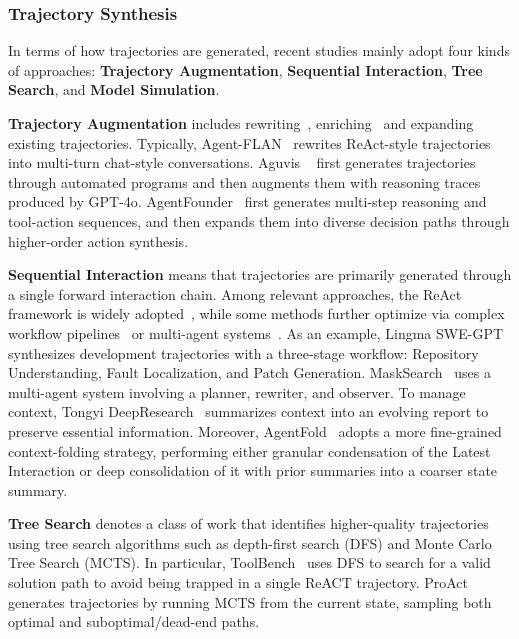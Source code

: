 \documentclass{llmxive}
\begin{document}
\subsubsection{Trajectory Synthesis}
\label{sec:Trajectory_synthesis}
In terms of how trajectories are generated, recent studies mainly adopt four kinds of approaches: \textbf{Trajectory Augmentation}, \textbf{Sequential Interaction}, \textbf{Tree Search}, and \textbf{Model Simulation}.


\textbf{Trajectory Augmentation} includes rewriting~\cite{Agent-FLAN}, enriching~\cite{Aguvis,UI-TARS,SIMA2} and expanding~\cite{AgentFounder} existing trajectories. Typically, Agent-FLAN~\cite{Agent-FLAN} rewrites ReAct-style trajectories into multi-turn chat-style conversations. Aguvis ~\cite{Aguvis} first generates trajectories through automated programs and then augments them with reasoning traces produced by GPT-4o. AgentFounder~\cite{AgentFounder} first generates multi-step reasoning and tool-action sequences, and then expands them into diverse decision paths through higher-order action synthesis.


\textbf{Sequential Interaction} means that trajectories are primarily generated through a single forward interaction chain. Among relevant approaches, the ReAct framework is widely adopted~\cite{AgentTuning, WebDancer, VSearcher}, while some methods further optimize via complex workflow pipelines~\cite{Lingma_SWE-GPT} or multi-agent systems~\cite{FlowReasoner, MaskSearch, WebWeaver, O-Researcher}. As an example, Lingma SWE-GPT~\cite{Lingma_SWE-GPT} synthesizes development trajectories with a three-stage workflow: Repository Understanding, Fault Localization, and Patch Generation. MaskSearch~\cite{MaskSearch} uses a multi-agent system involving a planner, rewriter, and observer. To manage context, Tongyi DeepResearch~\cite{Tongyi_DeepResearch} summarizes context into an evolving report to preserve essential information. Moreover, AgentFold~\cite{AgentFold} adopts a more fine-grained context-folding strategy, performing either granular condensation of the Latest Interaction or deep consolidation of it with prior summaries into a coarser state summary.


\textbf{Tree Search} denotes a class of work that identifies higher-quality trajectories using tree search algorithms such as depth-first search (DFS) and Monte Carlo Tree Search (MCTS). In particular, ToolBench~\cite{ToolBench} uses DFS to search for a valid solution path to avoid being trapped in a single ReACT trajectory. ProAct~\cite{ProAct} generates trajectories by running MCTS from the current state, sampling both optimal and suboptimal/dead-end paths.
\end{document}
